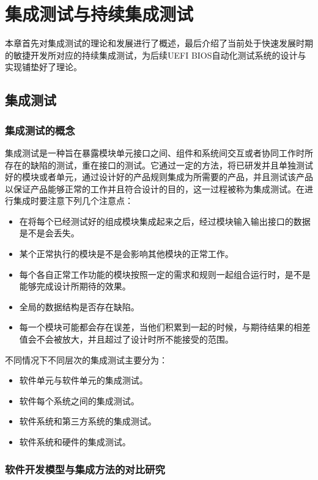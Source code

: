 \chapter{集成测试与持续集成测试}
\label{cha:intro}

本章首先对集成测试的理论和发展进行了概述，最后介绍了当前处于快速发展时期的敏捷开发所对应的持续集成测试，为后续UEFI BIOS自动化测试系统的设计与实现铺垫好了理论。

\section{集成测试}

\subsection{集成测试的概念}

  集成测试是一种旨在暴露模块单元接口之间、组件和系统间交互或者协同工作时所存在的缺陷的测试，重在接口的测试。它通过一定的方法，将已研发并且单独测试好的模块或者单元，通过设计好的产品规则集成为所需要的产品，并且测试该产品以保证产品能够正常的工作并且符合设计的目的，这一过程被称为集成测试。在进行集成时要注意下列几个注意点：
  
  \begin{itemize}
    \item 在将每个已经测试好的组成模块集成起来之后，经过模块输入输出接口的数据是不是会丢失。
	\item 某个正常执行的模块是不是会影响其他模块的正常工作。
	\item 每个各自正常工作功能的模块按照一定的需求和规则一起组合运行时，是不是能够完成设计所期待的效果。
	\item 全局的数据结构是否存在缺陷。
	\item 每一个模块可能都会存在误差，当他们积累到一起的时候，与期待结果的相差值会不会被放大，并且超过了设计时所不能接受的范围。
  \end{itemize}
  
  不同情况下不同层次的集成测试主要分为：

  \begin{itemize}
    \item 软件单元与软件单元的集成测试。
	\item 软件每个系统之间的集成测试。
	\item 软件系统和第三方系统的集成测试。
	\item 软件系统和硬件的集成测试。
  \end{itemize}
  
\subsection{软件开发模型与集成方法的对比研究}

